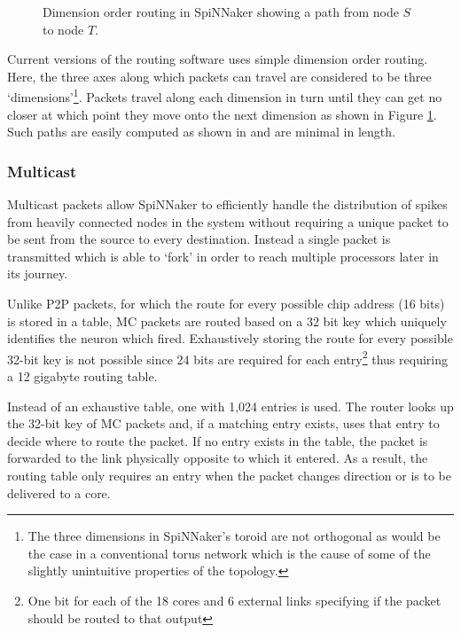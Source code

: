 				\begin{figure}
					\center
					
					\caption{Dimension order routing in SpiNNaker showing a path from node
					$S$ to node $T$.}
					\label{fig:dimension-order-routing}
				\end{figure}
				
				Current versions of the routing software uses simple dimension order
				routing. Here, the three axes along which packets can travel are
				considered to be three `dimensions'\footnote{The three dimensions in
				SpiNNaker's toroid are not orthogonal as would be the case in a
				conventional torus network which is the cause of some of the slightly
				unintuitive properties of the topology.}. Packets travel along each
				dimension in turn until they can get no closer at which point they move
				onto the next dimension as shown in Figure
				\ref{fig:dimension-order-routing}. Such paths are easily computed as
				shown in \cite{nocetti02} and are minimal in length.
			
			\subsubsection{Multicast}
				
				
				Multicast packets allow SpiNNaker to efficiently handle the distribution
				of spikes from heavily connected nodes in the system without requiring a
				unique packet to be sent from the source to every destination. Instead a
				single packet is transmitted which is able to `fork' in order to reach
				multiple processors later in its journey.
				
				Unlike P2P packets, for which the route for every possible chip address
				(16 bits) is stored in a table, MC packets are routed based on a 32 bit
				key which uniquely identifies the neuron which fired. Exhaustively
				storing the route for every possible 32-bit key is not possible since 24
				bits are required for each entry\footnote{One bit for each of the 18
				cores and 6 external links specifying if the packet should be routed to
				that output} thus requiring a 12 gigabyte routing table.
				
				Instead of an exhaustive table, one with 1,024 entries is used. The
				router looks up the 32-bit key of MC packets and, if a matching entry
				exists, uses that entry to decide where to route the packet. If no entry
				exists in the table, the packet is forwarded to the link physically
				opposite to which it entered. As a result, the routing table only
				requires an entry when the packet changes direction or is to be
				delivered to a core.
				
